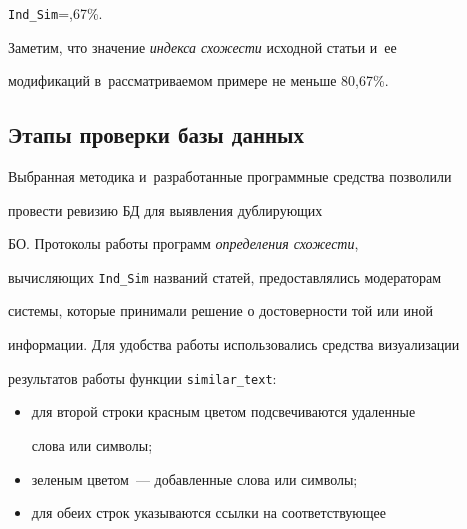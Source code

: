{{   }





     \verb"Ind_Sim"\;=,67\%.





     \smallskip





  Заметим, что значение \textit{индекса схожести} исходной статьи и~ее


модификаций в~рассматриваемом примере не меньше 80,67\%.





\vspace*{-4pt}





\subsection{ Этапы проверки базы данных}





\vspace*{-2pt}





  Выбранная методика и~разработанные программные средства позволили


провести ревизию БД для выявления дублирующих


БО. Протоколы работы программ \textit{определения схожести},


вычисляющих \verb"Ind_Sim" названий статей, предоставлялись модераторам


системы, которые принимали решение о достоверности той или иной


информации. Для удобства работы использовались средства визуализации


результатов работы функции \verb"similar_text":


  \begin{itemize}


\item для второй строки красным цветом подсвечиваются удаленные


слова или символы;


\item зеленым цветом~--- добавленные слова или символы;


\item для обеих строк указываются ссылки на соответствующее



\end{itemize}}
